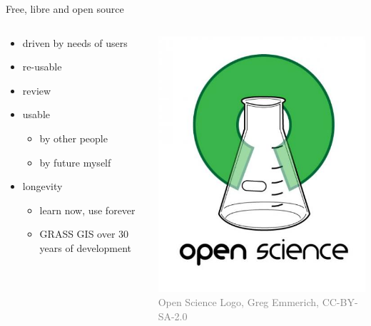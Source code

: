 \documentclass[xcolor={dvipsnames,usenames},beamer,aspectratio=169]{beamer}
\begin{document}
\begin{frame}{Free, libre and open source}

\begin{columns}
\begin{column}{0.4\textwidth}

\begin{itemize}
  \item driven by needs of users
  \item re-usable
  \item review
  \item usable
  \begin{itemize}
  \item by other people
  \item by future myself
  \end{itemize}
  \item longevity
  \begin{itemize}
  \item learn now, use forever
  \item GRASS GIS over 30 years of development
  \end{itemize}
\end{itemize}

\end{column}
\begin{column}{0.3\textwidth}

\begin{center}
  \includegraphics[width=\textwidth]{logos/open_science}
  \\
  \tiny
  \textcolor{gray}{Open Science Logo, Greg Emmerich, CC-BY-SA-2.0}
\end{center}


\end{column}
\end{columns}
\end{frame}
\end{document}
